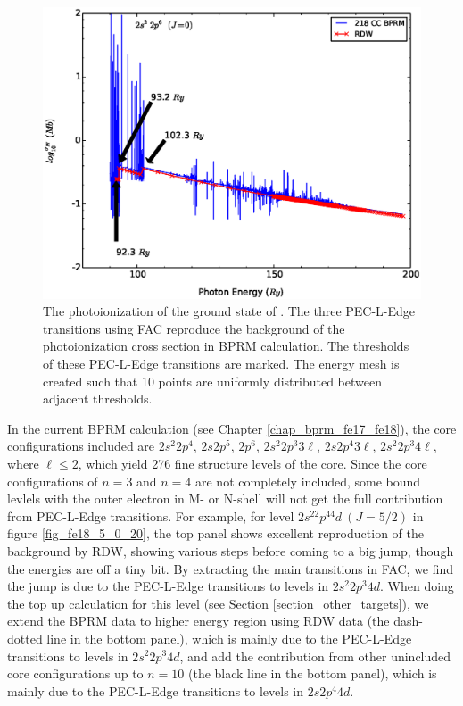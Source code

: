 \begin{figure}
	\centering
	\includegraphics[width=\textwidth]{figures_5/fe17_ground.eps}	
	\caption{The photoionization of the ground state of . The three PEC-L-Edge transitions using FAC reproduce the background of the photoionization cross section in BPRM calculation. The thresholds of these PEC-L-Edge transitions are marked. The energy mesh is created such that 10 points are uniformly distributed between adjacent thresholds.}
	\label{fig_fe17_ground}
\end{figure}

In the current  BPRM calculation (see Chapter \ref{chap_bprm_fe17_fe18}), the core configurations included are $2s^2 2p^4$, $2s 2p^5$, $2p^6$, $2s^2 2p^3 3\ell$, $2s 2p^4 3\ell$, $2s^2 2p^3 4\ell$, where $\ell\leq2$, which yield 276 fine structure levels of the core. Since the core configurations of $n=3$ and $n=4$ are not completely included, some bound levlels with the outer electron in M- or N-shell will not get the full contribution from PEC-L-Edge transitions. For example, for level $2s^22p^44d~(J=5/2)$ in figure \ref{fig_fe18_5_0_20}, the top panel shows excellent reproduction of the background by RDW, showing various steps before coming to a big jump, though the energies are off a tiny bit. By extracting the main transitions in FAC, we find the jump is due to the PEC-L-Edge transitions to levels in $2s^2 2p^3 4d$. When doing the top up calculation for this level (see Section \ref{section_other_targets}), we extend the BPRM data to higher energy region using RDW data (the dash-dotted line in the bottom panel), which is mainly due to the PEC-L-Edge transitions to levels in $2s^2 2p^3 4d$, and add the contribution from other unincluded core configurations up to $n=10$ (the black line in the bottom panel), which is mainly due to the PEC-L-Edge transitions to levels in $2s 2p^4 4d$. 

